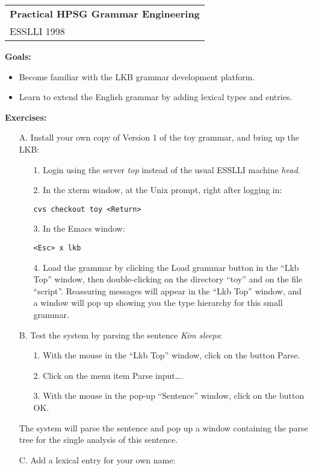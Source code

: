 \documentclass[10pt]{article}
\begin{document}
\begin{tabular}[t]{@{}l@{}}
\textbf{Practical HPSG Grammar Engineering}\\
ESSLLI 1998
\end{tabular}
\hfill
\mbox{}

\medskip
\textbf{Goals:}
\begin{itemize}
\item Become familiar with the LKB grammar development platform.
\item Learn to extend the English grammar by adding lexical types and entries.
\end{itemize}

\smallskip
\textbf{Exercises:}
\begin{itemize}
\item[A.] Install your own copy of Version 1 of the toy grammar, and bring up
the LKB:
\begin{itemize}
\item[1.] Login using the server {\it top} instead of the usual ESSLLI machine
{\it head}.
\item[2.] In the xterm window, at the Unix prompt, right after logging in:
\par\texttt{cvs checkout toy <Return>}
\item[3.] In the Emacs window:
\par\texttt{<Esc> x lkb}
\item[4.] Load the grammar by clicking the \textsf{Load grammar} button in the 
``Lkb Top'' window, then double-clicking on the directory ``toy'' and on the
file ``script''.  Reassuring messages will appear in the ``Lkb Top'' window,
and a window will pop up showing you the type hierarchy for this small
grammar.
\end{itemize}
\item[B.] Test the system by parsing the sentence \emph{Kim sleeps}:
\begin{itemize}
\item[1.] With the mouse in the ``Lkb Top'' window, click on the button
\textsf{Parse}. 
\item[2.] Click on the menu item \textsf{Parse input\ldots}.
\item[3.] With the mouse in the pop-up ``Sentence'' window, click on the
button \textsf{OK}.
\end{itemize}
The system will parse the sentence and pop up a window containing the parse
tree for the single analysis of this sentence.
\item[C.] Add a lexical entry for your own name:

\end{itemize}
\end{document}
